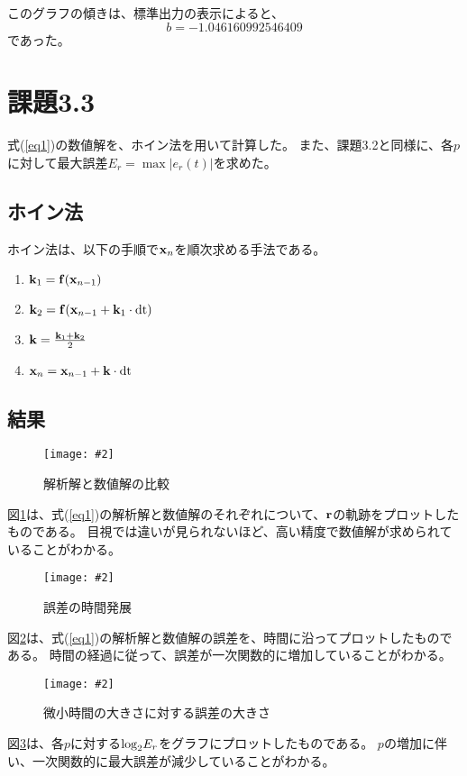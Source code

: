 \documentclass[11pt]{jsarticle}
\newcommand{\fg}[3]{ %
    \begin{figure}
        \texttt{[image: \#2]}
        \caption{#3}
        \label{#1}
    \end{figure}
}
\newcommand{\fr}[1]{図\ref{#1}}
\newcommand{\er}[1]{式(\ref{#1})}
\newcommand{\kb}{{\bf k}}
\newcommand{\xb}{{\bf x}}
\newcommand{\fb}{{\bf f}}
\newcommand{\dtn}{{\rm dt}}
\begin{document}
            このグラフの傾きは、標準出力の表示によると、
            \[
                b = -1.046160992546409
            \]
            であった。

    \section{課題3.3}
        \er{eq1}の数値解を、ホイン法を用いて計算した。
        また、課題3.2と同様に、各$p$に対して最大誤差$E_r = \max|e_r(t)|$を求めた。

        \subsection{ホイン法}
            ホイン法は、以下の手順で${\bf x}_{n}$を順次求める手法である。

            \begin{enumerate}
                \item $\kb_1 = \fb(\xb_{n-1})$
                \item $\kb_2 = \fb(\xb_{n-1} + \kb_1 \cdot \dtn)$
                \item $\kb = \frac{\kb_1 + \kb_2}{2}$
                \item $\xb_{n} = \xb_{n-1} + \kb \cdot \dtn$
            \end{enumerate}

        \subsection{結果}
            \fg{fig4}{graphs/heun/rc_ra.eps}{解析解と数値解の比較} 

            \fr{fig4}は、\er{eq1}の解析解と数値解のそれぞれについて、${\bf r}$の軌跡をプロットしたものである。
            目視では違いが見られないほど、高い精度で数値解が求められていることがわかる。

            \fg{fig5}{graphs/heun/error_by_time.eps}{誤差の時間発展}

            \fr{fig5}は、\er{eq1}の解析解と数値解の誤差を、時間に沿ってプロットしたものである。
            時間の経過に従って、誤差が一次関数的に増加していることがわかる。

            \fg{fig6}{graphs/heun/error_by_p.eps}{微小時間の大きさに対する誤差の大きさ}

            \fr{fig6}は、各$p$に対する${\rm log}_2E_r$をグラフにプロットしたものである。
            $p$の増加に伴い、一次関数的に最大誤差が減少していることがわかる。
\end{document}

